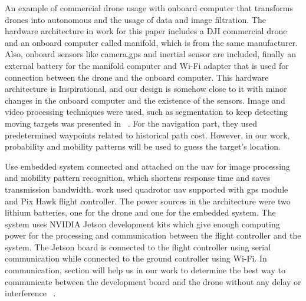 \documentclass[../main.tex]{subfiles}
\begin{document}

An example of commercial drone usage with onboard computer that transforms drones into autonomous and the usage of data and image filtration.
The hardware architecture in \citeauthor{Wang18} work for this paper includes a DJI commercial drone and an onboard computer called manifold, which is from the same manufacturer. Also, onboard sensors like camera,\gls{gps} and inertial sensor are included, finally an external battery for the manifold computer and Wi-Fi adapter that is used for connection between the drone and the onboard computer. This hardware architecture is Inspirational, and our design is somehow close to it with minor changes in the onboard computer and the existence of the sensors.   
Image and video processing techniques were used, such as segmentation to keep detecting moving targets was presented in ~\cite{Wang18}.
For the navigation part, they used predetermined waypoints related to historical path cost. However, in our work, probability and mobility patterns will be used to guess the target's location.

Use embedded system connected and attached on the \gls{uav} for image processing and mobility pattern recognition, which shortens response time and saves transmission bandwidth. 
\citeauthor{Zhao18} work used quadrotor \gls{uav} supported with \gls{gps} module and Pix Hawk flight controller. The power sources in the architecture were two lithium batteries, one for the drone and one for the embedded system. The system uses	NVIDIA Jetson development kits which give enough computing power for the processing and communication between the flight controller and the system. The Jetson board is connected to the flight controller using serial communication while connected to the ground controller using Wi-Fi. In communication, section will help us in our work to determine the best way to communicate between the development board and the drone without any delay or interference ~\cite{Zhao18}. 



\end{document}
